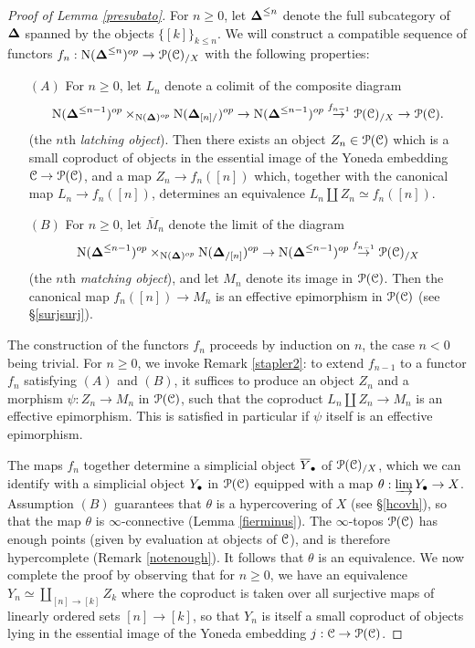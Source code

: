 \begin{proof}[Proof of Lemma \ref{presubato}]
For $n \geq 0$, let $\operatorname{{\bf \Delta}}^{\leq n}$ denote the full subcategory of $\operatorname{{\bf \Delta}}$ spanned by the objects
$\{ [k] \}_{k \leq n}$. We will construct a compatible sequence of functors
$f_{n}: \operatorname{N}( \operatorname{{\bf \Delta}}^{\leq n})^{op} \rightarrow \operatorname{\mathcal{P}}(\operatorname{\mathcal{C}})_{/X}$
with the following properties:
\begin{itemize}
\item[$(A)$] For $n \geq 0$, let $L_n$ denote a colimit of the composite diagram
$$ \operatorname{N}( \operatorname{{\bf \Delta}}^{\leq n-1})^{op} \times_{ \operatorname{N}(\operatorname{{\bf \Delta}})^{op} }
\operatorname{N}( \operatorname{{\bf \Delta}}_{[n]/})^{op} \rightarrow \operatorname{N}( \operatorname{{\bf \Delta}}^{\leq n-1})^{op}
\stackrel{ f_{n-1}}{\rightarrow} \operatorname{\mathcal{P}}(\operatorname{\mathcal{C}})_{/X} \rightarrow \operatorname{\mathcal{P}}(\operatorname{\mathcal{C}}).$$
(the $n$th {\it latching object}). Then there exists an object $Z_{n} \in \operatorname{\mathcal{P}}(\operatorname{\mathcal{C}})$ which
is a small coproduct of objects in the essential image of the Yoneda embedding
$\operatorname{\mathcal{C}} \rightarrow \operatorname{\mathcal{P}}(\operatorname{\mathcal{C}})$, and a map $Z_{n} \rightarrow f_{n}([n])$ which,
together with the canonical map $L_n \rightarrow f_{n}([n])$, determines an equivalence
$L_n \coprod Z_{n} \simeq f_{n}([n])$. 

\item[$(B)$] For $n \geq 0$, let $\overline{M}_n$ denote the limit of the diagram
$$ \operatorname{N}( \operatorname{{\bf \Delta}}^{\leq n-1})^{op} \times_{ \operatorname{N}(\operatorname{{\bf \Delta}})^{op} }
\operatorname{N}( \operatorname{{\bf \Delta}}_{/[n]})^{op} \rightarrow \operatorname{N}( \operatorname{{\bf \Delta}}^{\leq n-1})^{op}
\stackrel{ f_{n-1}}{\rightarrow} \operatorname{\mathcal{P}}(\operatorname{\mathcal{C}})_{/X}$$
(the $n$th {\it matching object}), and let $M_n$ denote its image in $\operatorname{\mathcal{P}}(\operatorname{\mathcal{C}})$.
Then the canonical map $f_{n}([n]) \rightarrow M_n$ is an effective epimorphism
in $\operatorname{\mathcal{P}}(\operatorname{\mathcal{C}})$ (see \S \ref{surjsurj}).
\end{itemize}
The construction of the functors $f_{n}$ proceeds by induction on $n$,
the case $n < 0$ being trivial. For $n \geq 0$, we invoke Remark \ref{stapler2}:
to extend $f_{n-1}$ to a functor $f_{n}$ satisfying $(A)$ and $(B)$, it suffices to produce
an object $Z_{n}$ and a morphism $\psi: Z_{n} \rightarrow M_n$ in $\operatorname{\mathcal{P}}(\operatorname{\mathcal{C}})$, such that
the coproduct $L_n \coprod Z_{n} \rightarrow M_n$ is an effective epimorphism.
This is satisfied in particular if $\psi$ itself is an effective epimorphism.

The maps $f_{n}$ together determine a simplicial object $\overline{Y}_{\bullet}$ of
$\operatorname{\mathcal{P}}(\operatorname{\mathcal{C}})_{/X}$, which we can identify with a simplicial object $Y_{\bullet}$
in $\operatorname{\mathcal{P}}(\operatorname{\mathcal{C}})$ equipped with a map $\theta: \varinjlim Y_{\bullet} \rightarrow X$.
Assumption $(B)$ guarantees that $\theta$ is a hypercovering of $X$ (see \S \ref{hcovh}),
so that the map $\theta$ is $\infty$-connective (Lemma \ref{fierminus}).
The $\infty$-topos $\operatorname{\mathcal{P}}(\operatorname{\mathcal{C}})$ has enough points (given by evaluation at objects of $\operatorname{\mathcal{C}}$), and is therefore hypercomplete (Remark \ref{notenough}). It follows that $\theta$ is an equivalence.
We now complete the proof by observing that for $n \geq 0$, we have an equivalence
$Y_{n} \simeq \coprod_{ [n] \rightarrow [k] } Z_{k}$
where the coproduct is taken over all surjective maps of linearly ordered sets $[n] \rightarrow [k]$, so that
$Y_{n}$ is itself a small coproduct of objects lying in the essential image of the Yoneda embedding
$j: \operatorname{\mathcal{C}} \rightarrow \operatorname{\mathcal{P}}(\operatorname{\mathcal{C}})$.
\end{proof}
  
